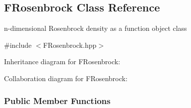\hypertarget{classFRosenbrock}{\subsection{\-F\-Rosenbrock \-Class \-Reference}
\label{classFRosenbrock}
}


n-\/dimensional \-Rosenbrock density as a function object class  




{\ttfamily \#include $<$\-F\-Rosenbrock.\-hpp$>$}



\-Inheritance diagram for \-F\-Rosenbrock\-:


\-Collaboration diagram for \-F\-Rosenbrock\-:
\subsubsection*{\-Public \-Member \-Functions}
